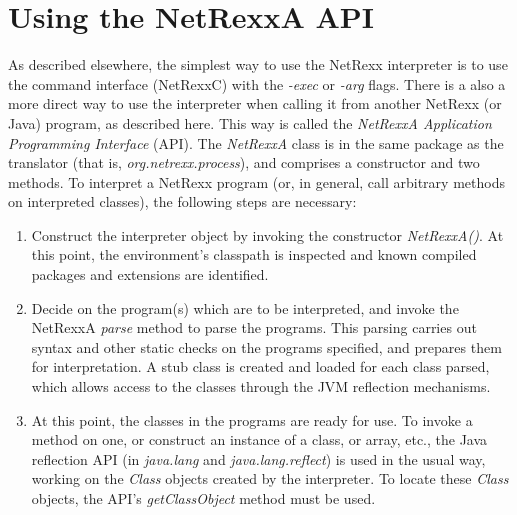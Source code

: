 \chapter{Using the NetRexxA API}\label{api}
As described elsewhere, the simplest way to use the NetRexx interpreter
is to use the command interface (NetRexxC) with the \emph{-exec}
or \emph{-arg} flags.
There is a also a more direct way to use the interpreter when calling it
from another NetRexx (or Java) program, as described here.  This
way is called the \emph{NetRexxA Application Programming Interface}
(API).
\newline
The \emph{NetRexxA} class is in the same package as the translator
(that is, \emph{org.netrexx.process}), and comprises a constructor
and two methods.  To interpret a NetRexx program (or, in general, call
arbitrary methods on interpreted classes), the following steps are
necessary:
\begin{enumerate}
\item Construct the interpreter object by invoking the constructor \emph{NetRexxA()}.
At this point, the environment's classpath is inspected and known
compiled packages and extensions are identified.
\item Decide on the program(s) which are to be interpreted, and invoke the
NetRexxA \emph{parse} method to parse the programs.  This parsing
carries out syntax and other static checks on the programs specified,
and prepares them for interpretation.  A stub class is created
and loaded for each class parsed, which allows access to the classes
through the JVM reflection mechanisms.
\item At this point, the classes in the programs are ready for use.  To invoke
a method on one, or construct an instance of a class, or array, etc.,
the Java reflection API (in \emph{java.lang} and \emph{java.lang.reflect})
is used in the usual way, working on the \emph{Class} objects created by
the interpreter.  To locate these \emph{Class} objects, the
API's \emph{getClassObject} method must be used.
\end{enumerate}

